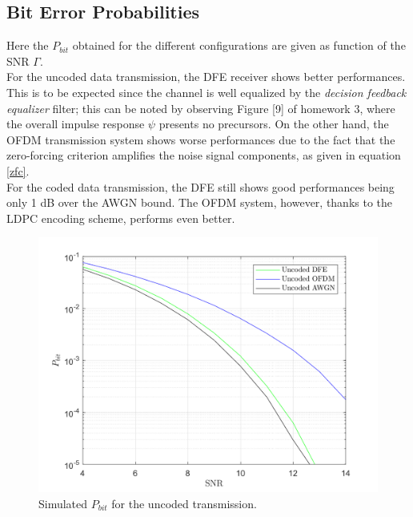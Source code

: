 \documentclass[a4paper, 12pt]{report}
\begin{document}
\subsection*{Bit Error Probabilities}
Here the $P_{bit}$ obtained for the different configurations are given as function of the SNR $\Gamma$. \\
For the uncoded data transmission, the DFE receiver shows better performances. This is to be expected since the channel is well equalized by the \textit{decision feedback equalizer} filter; this can be noted by observing Figure [9] of homework 3, where the overall impulse response $\psi$ presents no precursors. On the other hand, the OFDM transmission system shows worse performances due to the fact that the zero-forcing criterion amplifies the noise signal components, as given in equation \ref{zfc}. \\
For the coded data transmission, the DFE still shows good performances being only 1 dB over the AWGN bound. The OFDM system, however, thanks to the LDPC encoding scheme, performs even better.  

\begin{figure}[H]
	\centering
	\includegraphics[width=14cm]{uncoded}
	\caption{Simulated $P_{bit}$ for the uncoded transmission.}\label{uncoded}
\end{figure}
\end{document}
